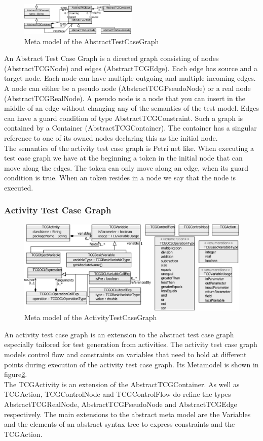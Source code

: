 \begin{figure}
\label{fig:AbstractTCGMetaModel}
\includegraphics[width=0.5\textwidth]{./pics/AbstractTestCaseGraph.pdf}
\caption{Meta model of the AbstractTestCaseGraph}
\end{figure}
An Abstract Test Case Graph is a directed graph consisting of nodes (AbstractTCGNode) and edges (AbstractTCGEdge). Each edge has source and a target node. Each node can have multiple outgoing and multiple incoming edges.
A node can either be a pseudo node (AbstractTCGPseudoNode) or a real node (AbstractTCGRealNode). A pseudo node is a node that you can insert in the middle of an edge without changing any of the semantics of the test model. Edges can have a guard condition of type AbstractTCGConstraint. Such a graph is contained by a Container (AbstractTCGContainer). The container has a singular reference to one of its owned nodes declaring this as the initial node. \\
The semantics of the activity test case graph is Petri net like. When executing a test case graph we have at the beginning a token in the initial node that can move along the edges. The token can only move along an edge, when its guard condition is true. When an token resides in a node we say that the node is executed.

\subsubsection{Activity Test Case Graph}
\begin{figure}
\label{fig:ActivityTCGMetaModel}
\includegraphics[width=\textwidth]{./pics/ActivityTestCaseGraph.pdf}
\caption{Meta model of the ActivityTestCaseGraph}
\end{figure}
An activity test case graph is an extension to the abstract test case graph especially tailored for test generation from activities. The activity test case graph models control flow and constraints on variables that need to hold at different points during execution of the activity test case graph. Its Metamodel is shown in figure\ref{fig:ActivityTCGMetaModel}.\\
The TCGActivity is an extension of the AbstractTCGContainer. As well as TCGAction, TCGControlNode and TCGControlFlow do refine the types AbstractTCGRealNode, AbstractTCGPseudoNode and AbstractTCGEdge respectively. 
The main extensions to the abstract meta model are the Variables and the elements of an abstract syntax tree to express constraints and the TCGAction.
